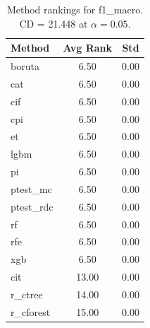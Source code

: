 \begin{table}[h]
\centering
\caption{Method rankings for f1_macro. CD = 21.448 at $\alpha=0.05$.}
\label{tab:ranks_f1_macro}
\begin{tabular}{lcc}
\toprule
Method & Avg Rank & Std \\
\midrule
boruta & 6.50 & 0.00 \\
cat & 6.50 & 0.00 \\
cif & 6.50 & 0.00 \\
cpi & 6.50 & 0.00 \\
et & 6.50 & 0.00 \\
lgbm & 6.50 & 0.00 \\
pi & 6.50 & 0.00 \\
ptest_mc & 6.50 & 0.00 \\
ptest_rdc & 6.50 & 0.00 \\
rf & 6.50 & 0.00 \\
rfe & 6.50 & 0.00 \\
xgb & 6.50 & 0.00 \\
cit & 13.00 & 0.00 \\
r_ctree & 14.00 & 0.00 \\
r_cforest & 15.00 & 0.00 \\
\bottomrule
\end{tabular}
\end{table}